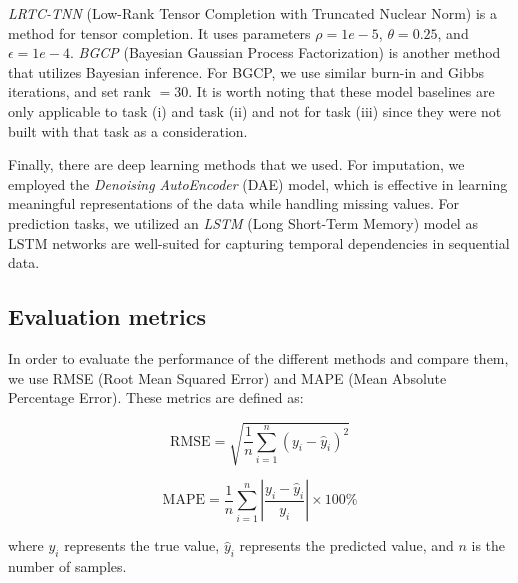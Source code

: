 \textit{LRTC-TNN}\cite{lrtc} (Low-Rank Tensor Completion with Truncated Nuclear Norm) is a method for tensor completion. It uses parameters $\rho = 1e-5$, $\theta = 0.25$, and $\epsilon = 1e-4$. \textit{BGCP} (Bayesian Gaussian Process Factorization) is another method that utilizes Bayesian inference. For BGCP, we use similar burn-in and Gibbs iterations, and set rank $= 30$. It is worth noting that these model baselines are only applicable to task (i) and task (ii) and not for task (iii) since they were not built with that task as a consideration.

Finally, there are deep learning methods that we used. For imputation, we employed the \textit{Denoising AutoEncoder} (DAE)\cite{dae} model, which is effective in learning meaningful representations of the data while handling missing values. For prediction tasks, we utilized an \textit{LSTM}\cite{lstm} (Long Short-Term Memory) model as LSTM networks are well-suited for capturing temporal dependencies in sequential data.

\subsection{Evaluation metrics}

In order to evaluate the performance of the different methods and compare them, we use RMSE (Root Mean Squared Error) and MAPE (Mean Absolute Percentage Error). These metrics are defined as:


\[
\text{RMSE} = \sqrt{\frac{1}{n} \sum_{i=1}^{n} (y_i - \hat{y}_i)^2}
\]

\[
\text{MAPE} = \frac{1}{n} \sum_{i=1}^{n} \left| \frac{y_i - \hat{y}_i}{y_i} \right| \times 100\%
\]

where \( y_i \) represents the true value, \( \hat{y}_i \) represents the predicted value, and \( n \) is the number of samples.